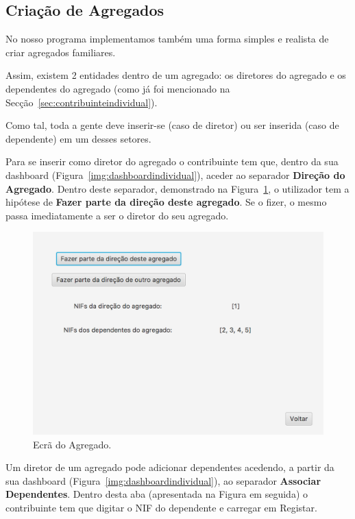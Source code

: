 \documentclass[a4paper]{article}
\begin{document}
\vspace{1.5cm}



\subsection{Criação de Agregados}
\label{sec:criacaodeagregados}

No nosso programa implementamos também uma forma simples e realista de criar agregados
familiares.

Assim, existem 2 entidades dentro de um agregado: os diretores do agregado e os
dependentes do agregado (como já foi mencionado na Secção~\ref{sec:contribuinteindividual}).

Como tal, toda a gente deve inserir-se (caso de diretor) ou ser inserida
(caso de dependente) em um desses setores.

Para se inserir como diretor do agregado o contribuinte tem que, dentro da sua dashboard
(Figura~\ref{img:dashboardindividual}), aceder ao separador \textbf{Direção do
Agregado}. Dentro deste separador, demonstrado na Figura~\ref{img:direcaodoagregado},
o utilizador tem a hipótese de \textbf{Fazer parte da direção deste agregado}. Se o fizer,
o mesmo passa imediatamente a ser o diretor do seu agregado.

\begin{figure}[H]
\centering
\includegraphics[scale=0.35]{imgs/direcaodoagregado.png}
\caption{Ecrã do Agregado.}
\label{img:direcaodoagregado}
\end{figure}

Um diretor de um agregado pode adicionar dependentes acedendo, a partir da sua dashboard
(Figura~\ref{img:dashboardindividual}), ao separador \textbf{Associar Dependentes}.
Dentro desta aba (apresentada na Figura em seguida) o contribuinte tem que digitar o NIF
do dependente e carregar em Registar.
\end{document}
